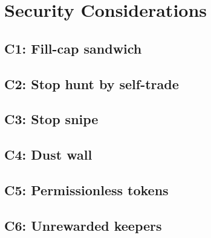 \section{Security Considerations}\label{sec:considerations}

\subsection{C1: Fill-cap sandwich}
\subsection{C2: Stop hunt by self-trade}
\subsection{C3: Stop snipe}
\subsection{C4: Dust wall}
\subsection{C5: Permissionless tokens}
\subsection{C6: Unrewarded keepers}
